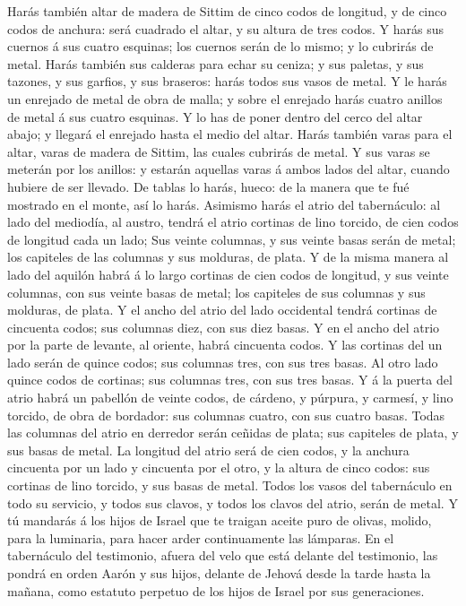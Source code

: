  Harás también altar de madera de Sittim de cinco codos de
longitud, y de cinco codos de anchura: será cuadrado el altar, y su
altura de tres codos.  Y harás sus cuernos á sus cuatro
esquinas; los cuernos serán de lo mismo; y lo cubrirás de metal.
 Harás también sus calderas para echar su ceniza; y sus
paletas, y sus tazones, y sus garfios, y sus braseros: harás todos sus
vasos de metal.  Y le harás un enrejado de metal de obra de
malla; y sobre el enrejado harás cuatro anillos de metal á sus cuatro
esquinas.  Y lo has de poner dentro del cerco del altar
abajo; y llegará el enrejado hasta el medio del altar. 
Harás también varas para el altar, varas de madera de Sittim, las cuales
cubrirás de metal.  Y sus varas se meterán por los anillos:
y estarán aquellas varas á ambos lados del altar, cuando hubiere de ser
llevado.  De tablas lo harás, hueco: de la manera que te fué
mostrado en el monte, así lo harás.  Asimismo harás el atrio
del tabernáculo: al lado del mediodía, al austro, tendrá el atrio
cortinas de lino torcido, de cien codos de longitud cada un lado;
 Sus veinte columnas, y sus veinte basas serán de metal;
los capiteles de las columnas y sus molduras, de plata.  Y
de la misma manera al lado del aquilón habrá á lo largo cortinas de cien
codos de longitud, y sus veinte columnas, con sus veinte basas de metal;
los capiteles de sus columnas y sus molduras, de plata.  Y
el ancho del atrio del lado occidental tendrá cortinas de cincuenta
codos; sus columnas diez, con sus diez basas.  Y en el
ancho del atrio por la parte de levante, al oriente, habrá cincuenta
codos.  Y las cortinas del un lado serán de quince codos;
sus columnas tres, con sus tres basas.  Al otro lado quince
codos de cortinas; sus columnas tres, con sus tres basas. 
Y á la puerta del atrio habrá un pabellón de veinte codos, de cárdeno, y
púrpura, y carmesí, y lino torcido, de obra de bordador: sus columnas
cuatro, con sus cuatro basas.  Todas las columnas del atrio
en derredor serán ceñidas de plata; sus capiteles de plata, y sus basas
de metal.  La longitud del atrio será de cien codos, y la
anchura cincuenta por un lado y cincuenta por el otro, y la altura de
cinco codos: sus cortinas de lino torcido, y sus basas de metal.
 Todos los vasos del tabernáculo en todo su servicio, y
todos sus clavos, y todos los clavos del atrio, serán de metal.
 Y tú mandarás á los hijos de Israel que te traigan aceite
puro de olivas, molido, para la luminaria, para hacer arder
continuamente las lámparas.  En el tabernáculo del
testimonio, afuera del velo que está delante del testimonio, las pondrá
en orden Aarón y sus hijos, delante de Jehová desde la tarde hasta la
mañana, como estatuto perpetuo de los hijos de Israel por sus
generaciones.


